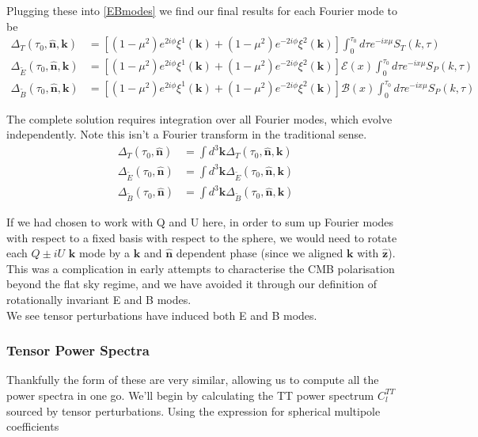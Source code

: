 \documentclass[a4paper,10pt]{article}
\renewcommand{\v}[1]{\mathbf{#1}}
\newcommand{\unit}[1]{\hat{\v{#1}}}
\begin{document}
Plugging these into \ref{EBmodes} we find our final results for each Fourier mode to be
\begin{equation}\begin{split}
\Delta_T(\tau_0,\unit{n},\v{k}) &= [(1-\mu^2) e^{2i\phi} \xi^1(\v{k})+(1-\mu^2) e^{-2i\phi} \xi^2(\v{k})]\int_0^{\tau_0}d\tau e^{-ix\mu}S_T(k,\tau)\\
\Delta_{\tilde{E}}(\tau_0,\unit{n},\v{k}) &= [(1-\mu^2) e^{2i\phi} \xi^1(\v{k})+(1-\mu^2) e^{-2i\phi} \xi^2(\v{k})]\mathcal{E}(x)\int_0^{\tau_0}d\tau e^{-ix\mu}S_P(k,\tau)\\
\Delta_{\tilde{B}}(\tau_0,\unit{n},\v{k}) &= [(1-\mu^2) e^{2i\phi} \xi^1(\v{k})+(1-\mu^2) e^{-2i\phi} \xi^2(\v{k})]\mathcal{B}(x)\int_0^{\tau_0}d\tau e^{-ix\mu}S_P(k,\tau)
\label{LoSFourier}
\end{split}\end{equation}

The complete solution requires integration over all Fourier modes, which evolve independently. Note this isn't a Fourier transform in the traditional sense. 
\begin{equation}\begin{split}
\Delta_T(\tau_0,\unit{n}) &= \int d^3\v{k} \Delta_T(\tau_0,\unit{n},\v{k})\\
\Delta_{\tilde{E}}(\tau_0,\unit{n}) &= \int d^3\v{k}\Delta_{\tilde{E}}(\tau_0,\unit{n},\v{k})\\
\Delta_{\tilde{B}}(\tau_0,\unit{n}) &= \int d^3\v{k}\Delta_{\tilde{B}}(\tau_0,\unit{n},\v{k})
\end{split}\end{equation}

If we had chosen to work with Q and U here, in order to sum up Fourier modes with respect to a fixed basis with respect to the sphere, we would need to rotate each $Q\pm iU$ $\v{k}$ mode by a $\v{k}$ and $\unit{n}$ dependent phase (since we aligned $\v{k}$ with $\unit{z}$). This was a complication in early attempts to characterise the CMB polarisation beyond the flat sky regime, and we have avoided it through our definition of rotationally invariant E and B modes.\\

We see tensor perturbations have induced both E and B modes.

\subsubsection{Tensor Power Spectra}

Thankfully the form of these are very similar, allowing us to compute all the power spectra in one go. We'll begin by calculating the TT power spectrum $C_l^{TT}$ sourced by tensor perturbations. Using the expression for spherical multipole coefficients 
\end{document}
